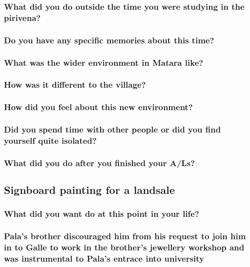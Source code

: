 \documentclass[11pt]{article}
\begin{document}
\subsubsection{What did you do outside the time you were studying in the pirivena?}
\label{sec:orge2004ed}
\subsubsection{Do you have any specific memories about this time?}
\label{sec:orgb2993a1}
\subsubsection{What was the wider environment in Matara like?}
\label{sec:orgf560416}
\subsubsection{How was it different to the village?}
\label{sec:orgaff3f19}
\subsubsection{How did you feel about this new environment?}
\label{sec:org87329a5}
\subsubsection{Did you spend time with other people or did you find yourself quite isolated?}
\label{sec:org7e55310}
\subsubsection{What did you do after you finished your A/Ls?}
\label{sec:orgfca00ba}

\subsection{Signboard painting for a landsale}
\label{sec:org72a5da7}

\subsubsection{What did you want do at this point in your life?}
\label{sec:org797eb2f}
\subsubsection{Pala's brother discouraged him from his request to join him in to Galle to work in the brother's jewellery workshop and was instrumental to Pala's entrace into university}
\label{sec:org20e36a5}
\end{document}
